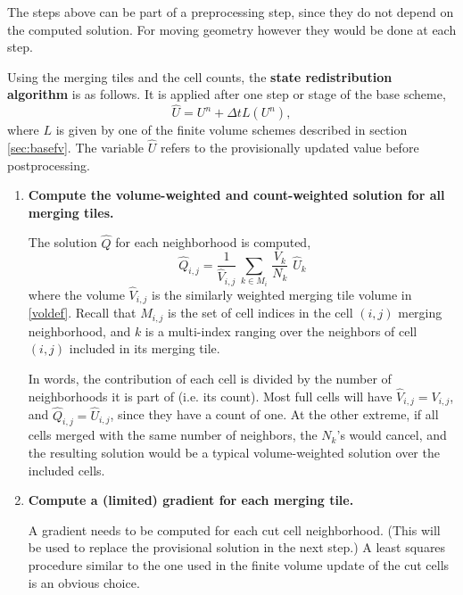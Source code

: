 The steps above can be part of a preprocessing step, since they do not
depend on the computed solution. For moving geometry however they would
be done at each step.

\vspace*{.1in}
Using the merging tiles and the cell counts, the {\bf state redistribution
algorithm} is as follows. It is applied after one step or stage of the base scheme,
$$
\widehat{U} = U^n + \Delta t L(U^n),
$$
where $L$ is given by one of the finite volume schemes
described in section \ref{sec:basefv}. The variable $\widehat{U}$ refers to the
provisionally updated value before postprocessing.

\begin{enumerate}
\item
{\bf Compute the volume-weighted and count-weighted solution for all
merging tiles.}   

\vspace*{.1in}
The solution $\widehat{Q}$ for each neighborhood is computed,
\begin{equation}
\label{tiledef}
\widehat{Q}_{i,j} =  \frac{1}{{\widehat V}_{i,j}} \, \sum_{k \in M_i} \,  
\frac{V_k}{N_k}  \,\,  \widehat{U}_k
\end{equation}
where the volume ${\widehat V}_{i,j}$ is the 
similarly weighted merging tile volume in \eqref{voldef}.
Recall that $M_{i,j}$ is the set of cell indices in the cell $(i,j)$ merging
neighborhood, and  
$k$ is  a multi-index ranging over the neighbors 
of cell $(i,j)$ included in its merging tile.

In words, the contribution of each cell is divided by the number of neighborhoods 
it is part of (i.e. its count). 
Most full cells will have ${\widehat V}_{i,j} = V_{i,j}$, 
and $\widehat{Q}_{i,j}  = \widehat{U}_{i,j}$, since they have a count of one.
At the other extreme, if all cells merged with the same number of neighbors, the $N_k$'s
would cancel, and the resulting solution would be a typical volume-weighted
solution over the included cells. 

\item
{\bf Compute a (limited) gradient for each merging
tile.}

\vspace*{.1in}
A gradient needs to be computed for each cut cell neighborhood. (This will be used
to replace the provisional solution in the next step.)
A least squares procedure  similar to the one used in
the finite volume update of the cut cells is an obvious choice. 


\end{enumerate}
